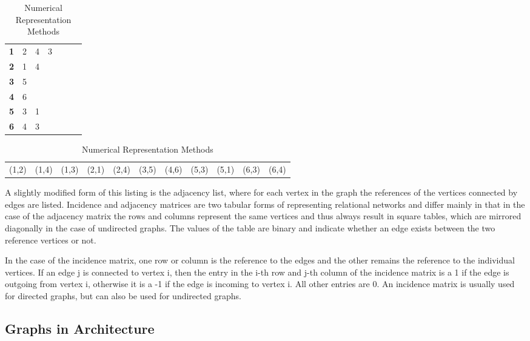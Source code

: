 \documentclass[a4paper, 12pt]{report}
\begin{document}
\begin{table}
\begin{subtable}{0.24\textwidth}
\begin{tabular}{ c c c c c c c }
\textbf{1} & 2 & 4 & 3 \\
\textbf{2} & 1 & 4 & \\
\textbf{3} & 5 & & \\
\textbf{4} & 6 & & \\
\textbf{5} & 3 & 1 & \\
\textbf{6} & 4 & 3 & \\
\end{tabular}
\label{tab:adjacency-list}
\end{subtable}
\newline
\vspace*{2pt}
\newline
\begin{subtable}{\textwidth}\centering
\begin{tabular}{ c c c c c c c c c c c }
(1,2) & (1,4) & (1,3) & (2,1) & (2,4) & (3,5) & (4,6) & (5,3) & (5,1) & (6,3) & (6,4) \\
\end{tabular}
\label{tab:edge-list}
\end{subtable}
\caption{Numerical Representation Methods}
\label{tab:numerical-representation-methods}
\end{table}

A slightly modified form of this listing is the adjacency list, where for each vertex in the graph the references of the vertices connected by edges are listed. Incidence and adjacency matrices are two tabular forms of representing relational networks and differ mainly in that in the case of the adjacency matrix the rows and columns represent the same vertices and thus always result in square tables, which are mirrored diagonally in the case of undirected graphs. The values of the table are binary and indicate whether an edge exists between the two reference vertices or not.

In the case of the incidence matrix, one row or column is the reference to the edges and the other remains the reference to the individual vertices. If an edge j is connected to vertex i, then the entry in the i-th row and j-th column of the incidence matrix is a 1 if the edge is outgoing from vertex i, otherwise it is a -1 if the edge is incoming to vertex i. All other entries are 0. An incidence matrix is usually used for directed graphs, but can also be used for undirected graphs.

\subsection{Graphs in Architecture}\label{subsec:graphs-in-architecture}
\end{document}
